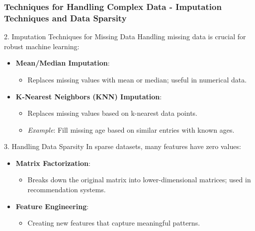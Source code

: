 \documentclass[aspectratio=169]{beamer}
\begin{document}
\begin{frame}[fragile]
    \frametitle{Techniques for Handling Complex Data - Imputation Techniques and Data Sparsity}
    \begin{block}{2. Imputation Techniques for Missing Data}
        Handling missing data is crucial for robust machine learning:
        \begin{itemize}
            \item \textbf{Mean/Median Imputation}: 
            \begin{itemize}
                \item Replaces missing values with mean or median; useful in numerical data.
            \end{itemize}
            \item \textbf{K-Nearest Neighbors (KNN) Imputation}: 
            \begin{itemize}
                \item Replaces missing values based on k-nearest data points.
                \item \textit{Example}: Fill missing age based on similar entries with known ages.
            \end{itemize}
        \end{itemize}
    \end{block}
    \begin{block}{3. Handling Data Sparsity}
        In sparse datasets, many features have zero values:
        \begin{itemize}
            \item \textbf{Matrix Factorization}: 
            \begin{itemize}
                \item Breaks down the original matrix into lower-dimensional matrices; used in recommendation systems.
            \end{itemize}
            \item \textbf{Feature Engineering}: 
            \begin{itemize}
                \item Creating new features that capture meaningful patterns.
            \end{itemize}
        \end{itemize}
    \end{block}
\end{frame}
\end{document}
